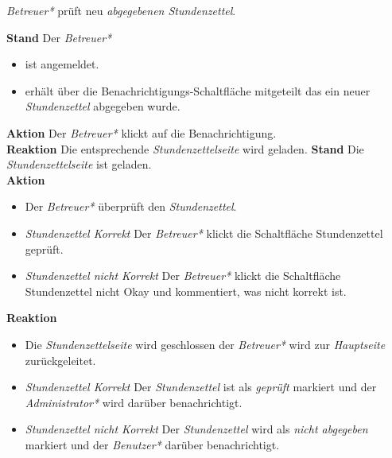 \begin{requirements}
	 \emph{Betreuer*} prüft neu \emph{abgegebenen Stundenzettel}.
	\begin{requirements}
	        \textbf{Stand} Der \emph{Betreuer*}
	            \begin{itemize}
	                \item ist angemeldet.
	                \item erhält über die Benachrichtigungs-Schaltfläche mitgeteilt das ein neuer \emph{Stundenzettel} abgegeben wurde.
	            \end{itemize}
            \textbf{Aktion} Der \emph{Betreuer*} klickt auf die Benachrichtigung. \\
            \textbf{Reaktion} Die entsprechende \emph{Stundenzettelseite} wird  geladen.
	        \textbf{Stand} Die \emph{Stundenzettelseite} ist geladen. \\
            \textbf{Aktion}
                \begin{itemize}
                    \item Der \emph{Betreuer*} überprüft den \emph{Stundenzettel}.
                    \item \textit{Stundenzettel Korrekt} Der \emph{Betreuer*} klickt die Schaltfläche Stundenzettel geprüft.
                    \item \textit{Stundenzettel nicht Korrekt}  Der \emph{Betreuer*} klickt die Schaltfläche Stundenzettel nicht Okay und kommentiert, was nicht korrekt ist.
                \end{itemize}
            \textbf{Reaktion}
                \begin{itemize}
                    \item Die \emph{Stundenzettelseite} wird geschlossen der \emph{Betreuer*} wird zur \emph{Hauptseite} zurückgeleitet.
                    \item \textit{Stundenzettel Korrekt} Der \emph{Stundenzettel} ist als \emph{geprüft} markiert und der \emph{Administrator*} wird darüber benachrichtigt.
                    \item \textit{Stundenzettel nicht Korrekt} Der \emph{Stundenzettel} wird als \emph{nicht abgegeben} markiert und der \emph{Benutzer*} darüber benachrichtigt.
                \end{itemize}
	\end{requirements}


\end{requirements}
